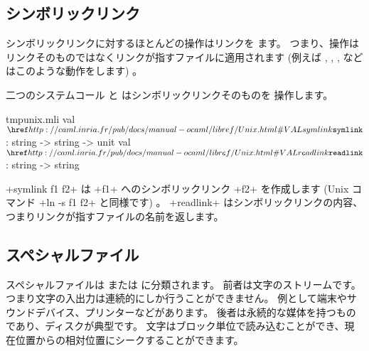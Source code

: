 \subsection*{シンボリックリンク}

シンボリックリンクに対するほとんどの操作はリンクを  ます。
つまり、操作はリンクそのものではなくリンクが指すファイルに適用されます
(例えば , , ,  など
はこのような動作をします) 。

二つのシステムコール  と  はシンボリックリンクそのものを
操作します。
%
\begin{listingcodefile}{tmpunix.mli}
val $\libvalue{Unix}{symlink}$  : string -> string -> unit
val $\libvalue{Unix}{readlink}$ : string -> string
\end{listingcodefile}
%
\ml+symlink f1 f2+ は \ml+f1+ へのシンボリックリンク \ml+f2+ を作成します
(Unix コマンド \ml+ln -s f1 f2+ と同様です) 。
\ml+readlink+ はシンボリックリンクの内容、つまりリンクが指すファイルの名前を返します。

\subsection*{\label{sec/speciaux}スペシャルファイル}

スペシャルファイルは  または  に分類されます。
前者は文字のストリームです。つまり文字の入出力は連続的にしか行うことができません。
例として端末やサウンドデバイス、プリンターなどがあります。
後者は永続的な媒体を持つものであり、ディスクが典型です。
文字はブロック単位で読み込むことができ、現在位置からの相対位置にシークすることができます。

